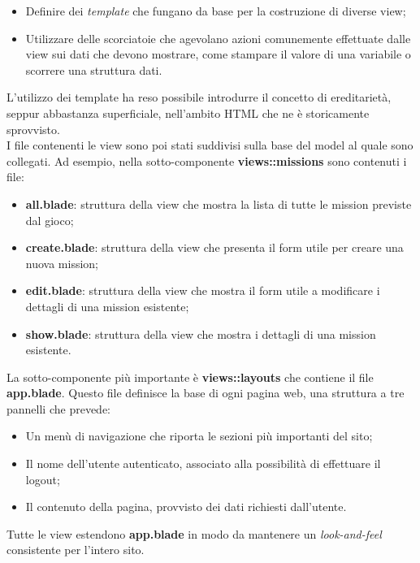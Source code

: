 \begin{itemize}
	\item Definire dei \textit{template} che fungano da base per la costruzione di diverse view;
	\item Utilizzare delle scorciatoie che agevolano azioni comunemente effettuate dalle view sui dati che devono mostrare, come stampare il valore di una variabile o scorrere una struttura dati.
\end{itemize}

L'utilizzo dei template ha reso possibile introdurre il concetto di ereditarietà, seppur abbastanza superficiale, nell'ambito HTML che ne è storicamente sprovvisto. \\
I file contenenti le view sono poi stati suddivisi sulla base del model al quale sono collegati. Ad esempio, nella sotto-componente \textbf{views::missions} sono contenuti i file:

\begin{itemize}
	\item \textbf{all.blade}: struttura della view che mostra la lista di tutte le mission previste dal gioco;
	\item \textbf{create.blade}: struttura della view che presenta il form utile per creare una nuova mission;
	\item \textbf{edit.blade}: struttura della view che mostra il form utile a modificare i dettagli di una mission esistente;
	\item \textbf{show.blade}: struttura della view che mostra i dettagli di una mission esistente.
\end{itemize}

La sotto-componente più importante è \textbf{views::layouts} che contiene il file \textbf{app.blade}. Questo file definisce la base di ogni pagina web, una struttura a tre pannelli che prevede: 

\begin{itemize}
	\item Un menù di navigazione che riporta le sezioni più importanti del sito;
	\item Il nome dell'utente autenticato, associato alla possibilità di effettuare il logout;
	\item Il contenuto della pagina, provvisto dei dati richiesti dall'utente.
\end{itemize}

Tutte le view estendono \textbf{app.blade} in modo da mantenere un \textit{look-and-feel} consistente per l'intero sito.

